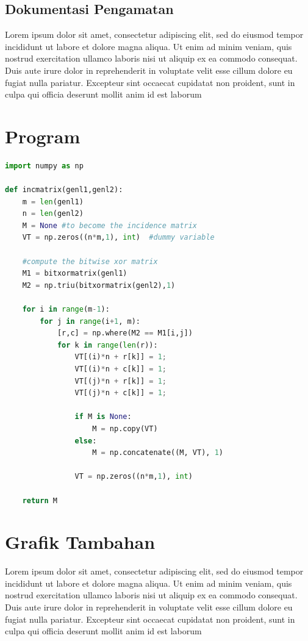     \section{Dokumentasi Pengamatan}
  \noindent Lorem ipsum dolor sit amet, consectetur adipiscing elit, sed do eiusmod tempor incididunt ut labore et dolore magna aliqua. Ut enim ad minim veniam, quis nostrud exercitation ullamco laboris nisi ut aliquip ex ea commodo consequat. Duis aute irure dolor in reprehenderit in voluptate velit esse cillum dolore eu fugiat nulla pariatur. Excepteur sint occaecat cupidatat non proident, sunt in culpa qui officia deserunt mollit anim id est laborum

\chapter{Program} \label{lam:lampiran_a}
\begin{lstlisting}[language=Python]
import numpy as np

def incmatrix(genl1,genl2):
    m = len(genl1)
    n = len(genl2)
    M = None #to become the incidence matrix
    VT = np.zeros((n*m,1), int)  #dummy variable

    #compute the bitwise xor matrix
    M1 = bitxormatrix(genl1)
    M2 = np.triu(bitxormatrix(genl2),1)

    for i in range(m-1):
        for j in range(i+1, m):
            [r,c] = np.where(M2 == M1[i,j])
            for k in range(len(r)):
                VT[(i)*n + r[k]] = 1;
                VT[(i)*n + c[k]] = 1;
                VT[(j)*n + r[k]] = 1;
                VT[(j)*n + c[k]] = 1;

                if M is None:
                    M = np.copy(VT)
                else:
                    M = np.concatenate((M, VT), 1)

                VT = np.zeros((n*m,1), int)

    return M
\end{lstlisting}

\chapter{Grafik Tambahan} \label{lampiran B}
 \noindent Lorem ipsum dolor sit amet, consectetur adipiscing elit, sed do eiusmod tempor incididunt ut labore et dolore magna aliqua. Ut enim ad minim veniam, quis nostrud exercitation ullamco laboris nisi ut aliquip ex ea commodo consequat. Duis aute irure dolor in reprehenderit in voluptate velit esse cillum dolore eu fugiat nulla pariatur. Excepteur sint occaecat cupidatat non proident, sunt in culpa qui officia deserunt mollit anim id est laborum
